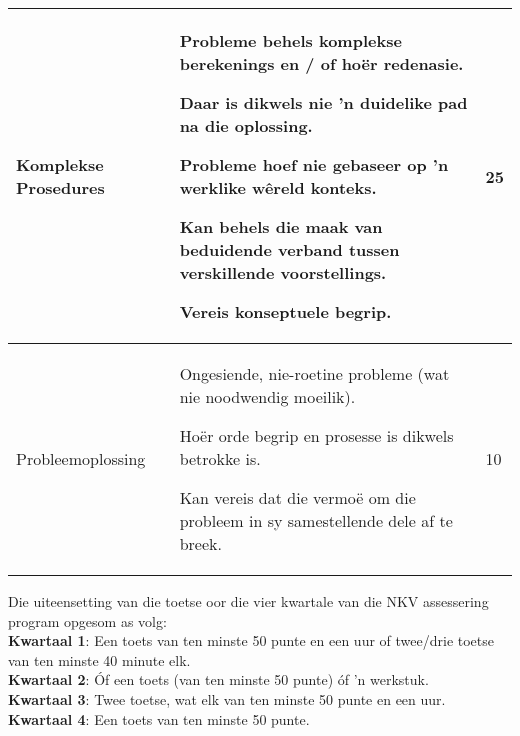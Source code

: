 \begin{table}[H]
\begin{center}
\begin{tabular} {|p{3cm}|p{7cm}|p{1.5cm}|}
Komplekse Prosedures &
Probleme behels komplekse berekenings en / of hoër redenasie. \par 
Daar is dikwels nie 'n duidelike pad na die oplossing. \par 
Probleme hoef nie gebaseer op 'n werklike wêreld konteks. \par 
Kan behels die maak van beduidende verband tussen verskillende voorstellings. \par 
Vereis konseptuele begrip.
&
25 \\ \hline
Probleemoplossing & 
Ongesiende, nie-roetine probleme (wat nie noodwendig moeilik). \par 
Hoër orde begrip en prosesse is dikwels betrokke is. \par 
Kan vereis dat die vermoë om die probleem in sy samestellende dele af te breek.
&
10 \\ \hline

\end{tabular}
 \end{center}
\end{table}

Die uiteensetting van die toetse oor die vier kwartale van die NKV assessering program opgesom as volg:\\
\textbf{Kwartaal 1}: Een toets van ten minste 50 punte en een uur of twee/drie toetse van ten minste 40 minute elk.\\
\textbf{Kwartaal 2}: \'{O}f een toets (van ten minste 50 punte) \'{o}f 'n werkstuk.\\
\textbf{Kwartaal 3}: Twee toetse, wat elk van ten minste 50 punte en een uur.\\
\textbf{Kwartaal 4}: Een toets van ten minste 50 punte.\\

